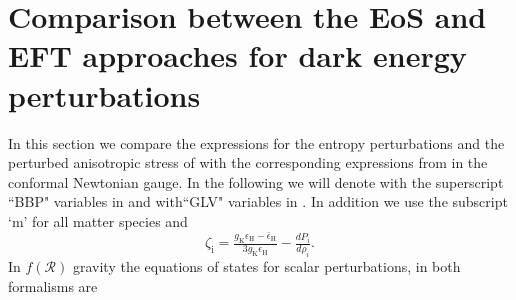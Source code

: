 \documentclass[nofootinbib,a4paper,aps,prd,10pt,superscriptaddress,reprint,showkeys,showpacs]{revtex4-1}
\newcommand{\qsubrm}[2]{{#1}_{\scriptscriptstyle{\textrm{#2}}}}
\begin{document}
\appendix*

\section{Comparison between the EoS and EFT approaches for dark energy perturbations}\label{sect:EoS_EFT}
In this section we compare the expressions for the entropy perturbations and the perturbed anisotropic stress of 
\cite{Battye2016a} with the corresponding expressions from \cite{Gleyzes2014} in the conformal Newtonian gauge. In the 
following we will denote with the superscript ``BBP" variables in \cite{Battye2016a} and with``GLV" variables in 
\cite{Gleyzes2014}. In addition we use the subscript `m' for all matter species and 
\begin{equation}
\qsubrm{\zeta}{i}=\tfrac{\qsubrm{g}{K}\qsubrm{\epsilon}{H}-\qsubrm{\bar{\epsilon}}{H}}
{3\qsubrm{g}{K}\qsubrm{\epsilon}{H}}-\tfrac{dP_i}{d\rho_i}.
\end{equation}
In $f(\mathcal{R})$ gravity the equations of states for scalar perturbations, in both formalisms are 
\cite{Battye2016a,Gleyzes2014}
\end{document}

